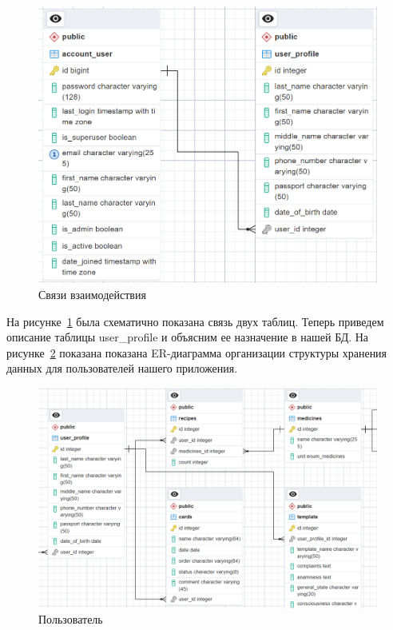 \begin{figure}
  \includegraphics[scale=0.655]{inc/user_account_user_profile}
  \caption{Связи взаимодействия}
  \label{fig:fig02}
\end{figure}

На рисунке~\ref{fig:fig02} была схематично показана связь двух таблиц. Теперь приведем описание таблицы user\_profile и объясним ее назначение в нашей БД. На рисунке~\ref{fig:fig03} показана показана ER-диаграмма организации структуры хранения данных для пользователей нашего приложения.

\begin{figure}
  \includegraphics[scale=0.54]{inc/user_profile}
  \caption{Пользователь}
  \label{fig:fig03}
\end{figure}


